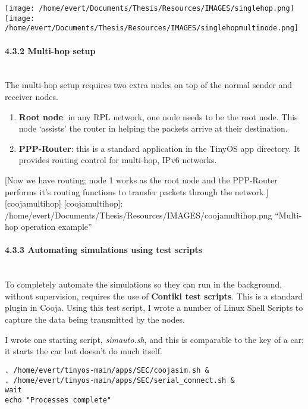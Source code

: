 \texttt{[image: /home/evert/Documents/Thesis/Resources/IMAGES/singlehop.png]}\texttt{[image: /home/evert/Documents/Thesis/Resources/IMAGES/singlehopmultinode.png]}

\paragraph{4.3.2 Multi-hop setup\\\\}\label{multi-hop-setup}

The multi-hop setup requires two extra nodes on top of the normal sender
and receiver nodes.

\begin{enumerate}
\def\labelenumi{\arabic{enumi}.}
\itemsep1pt\parskip0pt
\item
  \textbf{Root node}: in any RPL network, one node needs to be the root
  node. This node `assists' the router in helping the packets arrive at
  their destination.
\item
  \textbf{PPP-Router}: this is a standard application in the TinyOS app
  directory. It provides routing control for multi-hop, IPv6 networks.
\end{enumerate}

{[}Now we have routing; node 1 works as the root node and the PPP-Router
performs it's routing functions to transfer packets through the
network.{]}{[}coojamultihop{]} {[}coojamultihop{]}:
/home/evert/Documents/Thesis/Resources/IMAGES/coojamultihop.png
``Multi-hop operation example''

\paragraph{4.3.3 Automating simulations using test
scripts\\\\}\label{automating-simulations-using-test-scripts}

To completely automate the simulations so they can run in the
background, without supervision, requires the use of \textbf{Contiki
test scripts}. This is a standard plugin in Cooja. Using this test
script, I wrote a number of Linux Shell Scripts to capture the data
being transmitted by the nodes.

I wrote one starting script, \emph{simauto.sh}, and this is comparable
to the key of a car; it starts the car but doesn't do much itself.

\begin{verbatim}
. /home/evert/tinyos-main/apps/SEC/coojasim.sh &
. /home/evert/tinyos-main/apps/SEC/serial_connect.sh &
wait
echo "Processes complete"
\end{verbatim}

